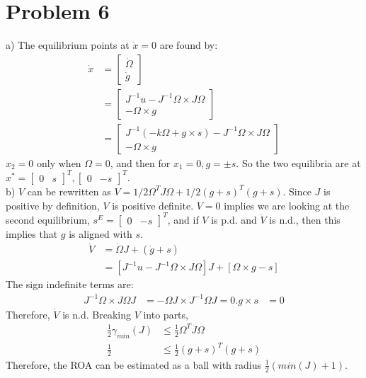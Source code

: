 \documentclass[paper=a4, fontsize=11pt]{scrartcl} %
\numberwithin{equation}{section} %
\numberwithin{figure}{section} %
\numberwithin{table}{section} %
\begin{document}
\section{Problem 6}
a) The equilibrium points at $\dot{x}=0$ are found by:
\begin{align}
\dot{x} &= \begin{bmatrix} \dot{\Omega} \\ \dot{g}\end{bmatrix} \\
&=  \begin{bmatrix}
J^{-1}u-J^{-1}\Omega\times J\Omega \\ -\Omega\times g
\end{bmatrix} \\
&=  \begin{bmatrix}
J^{-1}(-k\Omega + g\times s)-J^{-1}\Omega\times J\Omega \\ -\Omega\times g
\end{bmatrix}
\end{align}
$x_2=0$ only when $\Omega=0$, and then for $x_1=0, g= \pm s$. So the two equilibria are at $x^*=\begin{bmatrix}
0 & s \end{bmatrix}^T, \begin{bmatrix} 0 & -s \end{bmatrix}^T$. \\

b) $V$ can be rewritten as $V=1/2\Omega^TJ\Omega + 1/2(g+s)^T(g+s)$. Since $J$ is positive by definition, $V$ is positive definite. $V=0$ implies we are looking at the second equilibrium, $s^E=\begin{bmatrix} 0 & -s \end{bmatrix}^T$, and if $V$ is p.d. and $\dot{V}$ is n.d., then this implies that $g$ is aligned with $s$.
\begin{align}
\dot{V} &= \dot{\Omega}J+(\dot{g}+s) \\
&=[J^{-1}u-J^{-1}\Omega\times J\Omega]J + [\Omega\times g-s]
\end{align}
The sign indefinite terms are: 
\begin{align}
J^{-1}\Omega\times J\Omega J &= -\Omega J\times J^{-1}\Omega J = 0.
g\times s &= 0
\end{align}
Therefore, $\dot{V}$ is n.d. Breaking $V$ into parts, 
\begin{align}
\frac{1}{2}\gamma_{min}(J) &\leq \frac{1}{2}\Omega^TJ\Omega \\
\frac{1}{2} &\leq \frac{1}{2}(g+s)^T(g+s)
\end{align}
Therefore, the ROA can be estimated as a ball with radius $\frac{1}{2}(min(J)+1)$.
\end{document}
